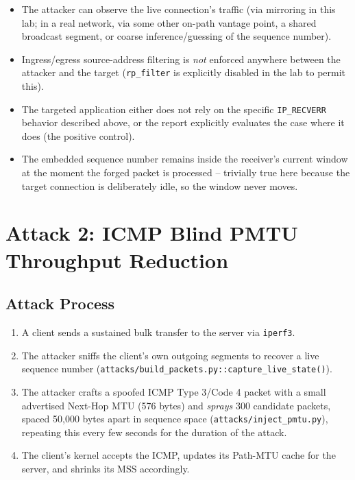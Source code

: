 \documentclass[11pt]{article}
\begin{document}
\begin{itemize}
    \item The attacker can observe the live connection's traffic (via
    mirroring in this lab; in a real network, via some other on-path
    vantage point, a shared broadcast segment, or coarse
    inference/guessing of the sequence number).
    \item Ingress/egress source-address filtering is \emph{not} enforced
    anywhere between the attacker and the target (\texttt{rp\_filter} is
    explicitly disabled in the lab to permit this).
    \item The targeted application either does not rely on the specific
    \texttt{IP\_RECVERR} behavior described above, or the report
    explicitly evaluates the case where it does (the positive control).
    \item The embedded sequence number remains inside the receiver's
    current window at the moment the forged packet is processed --
    trivially true here because the target connection is deliberately
    idle, so the window never moves.
\end{itemize}

\section{Attack 2: ICMP Blind PMTU Throughput Reduction}

\subsection{Attack Process}

\begin{enumerate}
    \item A client sends a sustained bulk transfer to the server via
    \texttt{iperf3}.
    \item The attacker sniffs the client's own outgoing segments to
    recover a live sequence number
    (\texttt{attacks/build\_packets.py::capture\_live\_state()}).
    \item The attacker crafts a spoofed ICMP Type 3/Code 4 packet with a
    small advertised Next-Hop MTU (576 bytes) and \emph{sprays} 300
    candidate packets, spaced 50{,}000 bytes apart in sequence space
    (\texttt{attacks/inject\_pmtu.py}), repeating this every few seconds
    for the duration of the attack.
    \item The client's kernel accepts the ICMP, updates its Path-MTU
    cache for the server, and shrinks its MSS accordingly.
\end{enumerate}
\end{document}
